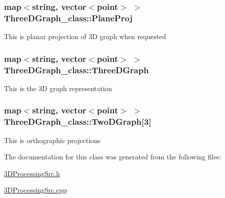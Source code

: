 \subsubsection[{\texorpdfstring{Plane\+Proj}{PlaneProj}}]{\setlength{\rightskip}{0pt plus 5cm}map$<$string, vector$<${\bf point}$>$ $>$ Three\+D\+Graph\+\_\+class\+::\+Plane\+Proj}\hypertarget{classThreeDGraph__class_ad800b572d58a46cbd5b4139b3ec7b173}{}\label{classThreeDGraph__class_ad800b572d58a46cbd5b4139b3ec7b173}
This is planar projection of 3D graph when requested 
\subsubsection[{\texorpdfstring{Three\+D\+Graph}{ThreeDGraph}}]{\setlength{\rightskip}{0pt plus 5cm}map$<$string, vector$<${\bf point}$>$ $>$ Three\+D\+Graph\+\_\+class\+::\+Three\+D\+Graph}\hypertarget{classThreeDGraph__class_a10f2244053d72def3eed9fb4101f0236}{}\label{classThreeDGraph__class_a10f2244053d72def3eed9fb4101f0236}
This is the 3D graph representation 
\subsubsection[{\texorpdfstring{Two\+D\+Graph}{TwoDGraph}}]{\setlength{\rightskip}{0pt plus 5cm}map$<$string, vector$<${\bf point}$>$ $>$ Three\+D\+Graph\+\_\+class\+::\+Two\+D\+Graph\mbox{[}3\mbox{]}}\hypertarget{classThreeDGraph__class_a352d2c3b25256d8a071132dd87606f99}{}\label{classThreeDGraph__class_a352d2c3b25256d8a071132dd87606f99}
This is orthographic projections 

The documentation for this class was generated from the following files\+:\begin{DoxyCompactItemize}
\item 
\hyperlink{3DProcessingSrc_8h}{3\+D\+Processing\+Src.\+h}\item 
\hyperlink{3DProcessingSrc_8cpp}{3\+D\+Processing\+Src.\+cpp}\end{DoxyCompactItemize}
